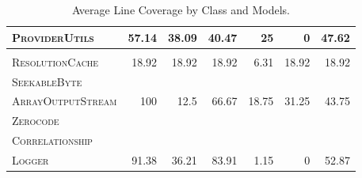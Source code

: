 \begin{table}[H]
\begin{tabular}{| l | r | r | r | r | r | r |}
\scriptsize\textsc{ProviderUtils} & 57.14 & 38.09 & 40.47 & 25 & 0 & 47.62 \\
\hline
\scriptsize\textsc{} &  &  &  &  &  &  \\
\scriptsize\textsc{ResolutionCache} & 18.92 & 18.92 & 18.92 & 6.31 & 18.92 & 18.92 \\
\hline
\scriptsize\textsc{SeekableByte} &  &  &  &  &  &  \\
\scriptsize\textsc{ArrayOutputStream} & 100 & 12.5 & 66.67 & 18.75 & 31.25 & 43.75 \\
\hline
\scriptsize\textsc{Zerocode} &  &  &  &  &  &  \\
\scriptsize\textsc{Correlationship} &  &  &  &  &  &  \\
\scriptsize\textsc{Logger} & 91.38 & 36.21 & 83.91 & 1.15 & 0 & 52.87 \\
\hline

\end{tabular}
\caption{Average Line Coverage by Class and Models.}
\label{tab:line_coverage}
\end{table}

